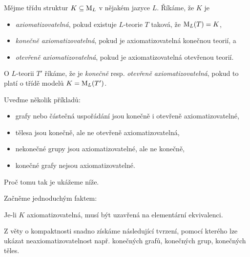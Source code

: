 \begin{definition}[Axiomatizovatelnost]
Mějme třídu struktur $K\subseteq\operatorname{M}_L$ v nějakém jazyce $L$. Říkáme, že $K$ je
\begin{itemize}
    \item \emph{axiomatizovatelná}, pokud existuje $L$-teorie $T$ taková, že $\operatorname{M}_L(T)=K$,
    \item \emph{konečně axiomatizovatelná}, pokud je axiomatizovatelná konečnou teorií, a
    \item \emph{otevřeně axiomatizovatelná}, pokud je axiomatizovatelná otevřenou teorií.
\end{itemize}
O $L$-teorii $T'$ říkáme, že je \emph{konečně} resp. \emph{otevřeně axiomatizovatelná}, pokud to platí o třídě modelů $K=\operatorname{M}_L(T')$.
\end{definition}

\begin{example}
    Uveďme několik příkladů:
    \begin{itemize}
        \item grafy nebo částečná uspořádání jsou konečně i otevřeně axiomatizovatelné,
        \item tělesa jsou konečně, ale ne otevřeně axiomatizovatelná,
        \item nekonečné grupy jsou axiomatizovatelné, ale ne konečně,
        \item konečné grafy nejsou axiomatizovatelné.
    \end{itemize}
    Proč tomu tak je ukážeme níže.
\end{example}

Začněme jednoduchým faktem:

\begin{observation}
    Je-li $K$ axiomatizovatelná, musí být uzavřená na elementární ekvivalenci.  
\end{observation}

Z věty o kompaktnosti snadno získáme následující tvrzení, pomocí kterého lze ukázat neaxiomatizovatelnost např. konečných grafů, konečných grup, konečných těles.

